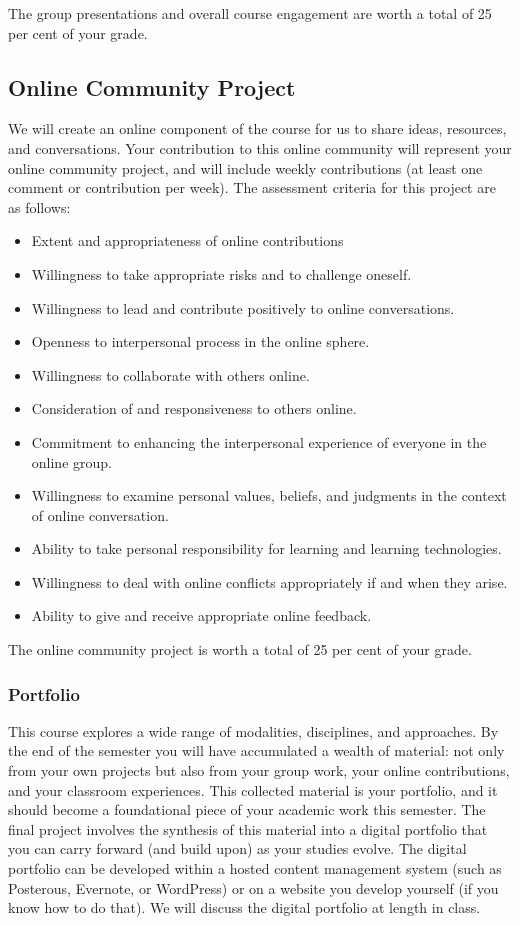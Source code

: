 \documentclass[letterpaper,10pt,headsepline]{scrreprt}
\begin{document}
The group presentations and overall course engagement are worth a total of 25 per cent of your grade.

\subsection{Online Community Project}

We will create an online component of the course for us to share ideas, resources, and conversations. Your contribution to this online community will represent your online community project, and will include weekly contributions (at least one comment or contribution per week). The assessment criteria for this project are as follows:

\begin{itemize}
\item Extent and appropriateness of online contributions
\item Willingness to take appropriate risks and to challenge oneself.
\item Willingness to lead and contribute positively to online conversations.
\item Openness to interpersonal process in the online sphere.
\item Willingness to collaborate with others online.
\item Consideration of and responsiveness to others online.
\item Commitment to enhancing the interpersonal experience of everyone in the online group.
\item Willingness to examine personal values, beliefs, and judgments in the context of online conversation.
\item Ability to take personal responsibility for learning and learning technologies.
\item Willingness to deal with online conflicts appropriately if and when they arise.
\item Ability to give and receive appropriate online feedback.
 
\end{itemize}

The online community project is worth a total of 25 per cent of your grade.

\subsubsection{Portfolio}

This course explores a wide range of modalities, disciplines, and approaches. By the end of the semester you will have accumulated a wealth of material: not only from your own projects but also from your group work, your online contributions, and your classroom experiences. This collected material is your portfolio, and it should become a foundational piece of your academic work this semester. The final project involves the synthesis of this material into a digital portfolio that you can carry forward (and build upon) as your studies evolve. The digital portfolio can be developed within a hosted content management system (such as Posterous, Evernote, or WordPress) or on a website you develop yourself (if you know how to do that). We will discuss the digital portfolio at length in class.
\end{document}
